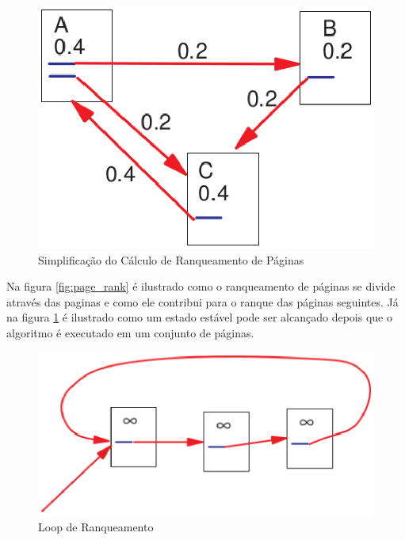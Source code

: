 \begin{figure}[h]
    \centering
        \includegraphics[keepaspectratio=true,scale=0.5]{figuras/page_rank2.eps}
    \caption{Simplificação do Cálculo de Ranqueamento de Páginas}
    \label{fig:page_rank2}
\end{figure}

Na figura \ref{fig:page_rank} é ilustrado como o ranqueamento de páginas se divide através das paginas e como ele contribui para o ranque das páginas seguintes. Já na figura \ref{fig:page_rank2} é ilustrado como um estado estável pode ser alcançado depois que o algoritmo é executado em um conjunto de páginas. 




\begin{figure}[h]
    \centering
        \includegraphics[keepaspectratio=true,scale=0.5]{figuras/page_rank3.eps}
    \caption{Loop de Ranqueamento}
    \label{fig:page_rank3}
\end{figure}

